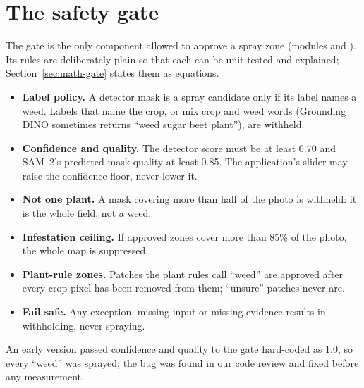 \section{The safety gate}\label{sec:gate}
The gate is the only component allowed to approve a spray zone (modules
 and ). Its rules are deliberately plain so that each can be unit tested and
explained; Section~\ref{sec:math-gate} states them as equations.
\begin{itemize}
\item \textbf{Label policy.} A detector mask is a spray candidate only if its label names a weed.
  Labels that name the crop, or mix crop and weed words (Grounding DINO sometimes returns ``weed sugar
  beet plant''), are withheld.
\item \textbf{Confidence and quality.} The detector score must be at least 0.70 and SAM~2's predicted
  mask quality at least 0.85. The application's slider may raise the confidence floor, never lower it.
\item \textbf{Not one plant.} A mask covering more than half of the photo is withheld: it is the whole
  field, not a weed.
\item \textbf{Infestation ceiling.} If approved zones cover more than 85\% of the photo, the whole map
  is suppressed.
\item \textbf{Plant-rule zones.} Patches the plant rules call ``weed'' are approved after every crop
  pixel has been removed from them; ``unsure'' patches never are.
\item \textbf{Fail safe.} Any exception, missing input or missing evidence results in withholding,
  never spraying.
\end{itemize}
An early version passed confidence and quality to the gate hard-coded as 1.0, so every ``weed'' was
sprayed; the bug was found in our code review and fixed before any measurement.

